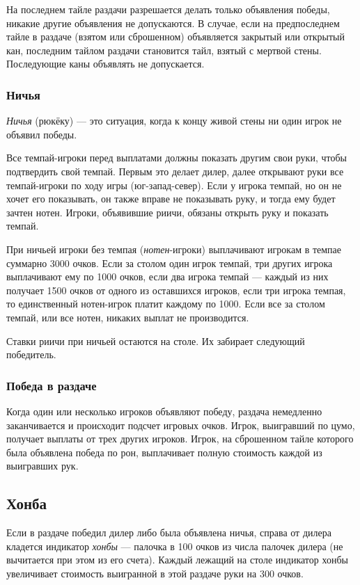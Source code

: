 На последнем тайле раздачи разрешается делать только объявления победы, никакие другие объявления не допускаются. В случае, если на предпоследнем тайле в раздаче (взятом или сброшенном) объявляется закрытый или открытый кан, последним тайлом раздачи становится тайл, взятый с мертвой стены. Последующие каны объявлять не допускается. 

\subsubsection{Ничья}

\textit{Ничья} (рюкёку) --- это ситуация, когда к концу живой стены ни один игрок не объявил победы.

Все темпай-игроки перед выплатами должны показать другим свои руки, чтобы подтвердить свой темпай. Первым это делает дилер, далее открывают руки все темпай-игроки по ходу игры (юг-запад-север). Если у игрока темпай, но он не хочет его показывать, он также вправе не показывать руку, и тогда ему будет зачтен нотен. Игроки, объявившие риичи, обязаны открыть руку и показать темпай.

При ничьей игроки без темпая (\textit{нотен}-игроки) выплачивают игрокам в темпае суммарно 3000 очков. Если за столом один игрок темпай, три других игрока выплачивают ему по 1000 очков, если два игрока темпай --- каждый из них получает 1500 очков от одного из оставшихся игроков, если три игрока темпая, то единственный нотен-игрок платит каждому по 1000. Если все за столом темпай, или все нотен, никаких выплат не производится.

Ставки риичи при ничьей остаются на столе. Их забирает следующий победитель.

\subsubsection{Победа в раздаче}

Когда один или несколько игроков объявляют победу, раздача немедленно заканчивается и происходит подсчет игровых очков. Игрок, выигравший по цумо, получает выплаты от трех других игроков. Игрок, на сброшенном тайле которого была объявлена победа по рон, выплачивает полную стоимость каждой из выигравших рук.

\subsection{Хонба}

Если в раздаче победил дилер либо была объявлена ничья, справа от дилера кладется индикатор \textit{хонбы} --- палочка в 100 очков из числа палочек дилера (не вычитается при этом из его счета). Каждый лежащий на столе индикатор хонбы увеличивает стоимость выигранной в этой раздаче руки на 300 очков.

